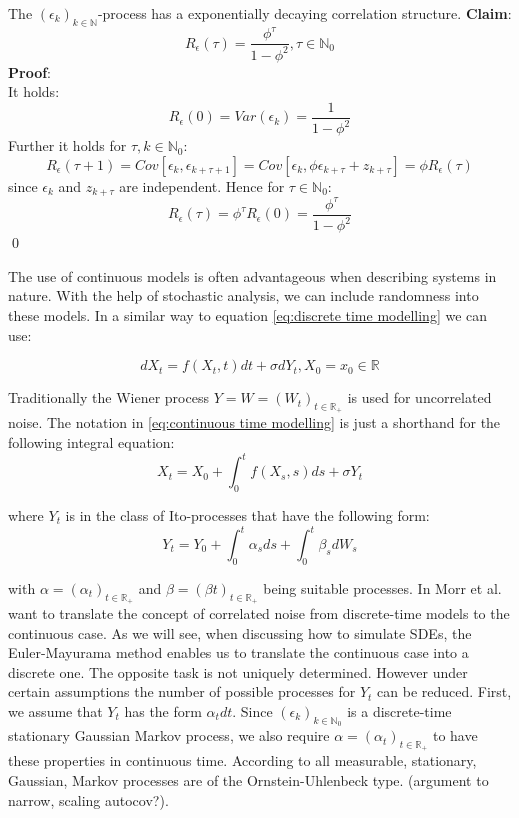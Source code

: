 \documentclass[%
thesis=student,%
coverpage=false,%
titlepage=false,%
headmarks=true, %
english,%
font=libertine, %
math=newpxtx, %
BCOR=5mm,%
coverBCOR=11mm%
]{tumbook}
\begin{document}
The $(\epsilon_{k})_{k \in \mathbb{N}}$-process has a exponentially decaying correlation structure. \textbf{Claim}:
\[
R_{\epsilon}(\tau) = \frac{\phi^{\tau}}{1-\phi^{2}}, \tau \in \mathbb{N}_{0}
\]
\textbf{Proof}: \\
It holds: 
\[
R_{\epsilon}(0)= Var(\epsilon_{k}) = \frac{1}{1-\phi^{2}}
\]
Further it holds for $\tau, k \in \mathbb{N}_{0}$:
\[
R_{\epsilon}(\tau+1) = Cov[\epsilon_{k},\epsilon_{k+\tau + 1}] = Cov[\epsilon_{k},\phi\epsilon_{k+\tau}+z_{k+\tau}] = \phi R_{\epsilon}(\tau)
\]
since $\epsilon_{k}$ and $z_{k+\tau}$ are independent. Hence for $\tau \in \mathbb{N}_{0}$:
\[
R_{\epsilon}(\tau) = \phi^{\tau}R_{\epsilon}(0)=\frac{\phi^{\tau}}{1-\phi^{2}}
\]
\qed

The use of continuous models is often advantageous when describing systems in nature. With the help of stochastic analysis, we can include randomness into these models. In a similar way to equation \ref{eq:discrete time modelling} we can use: 

\begin{equation}
    dX_{t} = f(X_{t},t)dt + \sigma dY_{t}, X_{0} = x_{0} \in \mathbb{R}
    \label{eq:continuous time modelling}
\end{equation}

Traditionally the Wiener process $Y = W = (W_{t})_{t\in \mathbb{R}_{+}}$ is used for uncorrelated noise. The notation in \ref{eq:continuous time modelling} is just a shorthand for the following integral equation:
\[
X_{t} = X_{0} + \int_{0}^{t}f(X_{s},s)ds + \sigma Y_{t}
\]

where $Y_{t}$ is in the class of Ito-processes that have the following form:
\begin{equation}
    Y_{t} = Y_{0} + \int_{0}^{t}\alpha_{s}ds + \int_{0}^{t}\beta_{s}dW_{s}
    \label{eq:Ito process}
\end{equation}

with $\alpha = (\alpha_{t})_{t\in\mathbb{R}_{+}}$ and $\beta = (\beta{t})_{t\in\mathbb{R}_{+}}$ being suitable processes.
In \cite{Morr:2022} Morr et al. want to translate the concept of correlated noise from discrete-time models to the continuous case. As we will see, when discussing how to simulate SDEs, the Euler-Mayurama method enables us to translate the continuous case into a discrete one. The opposite task is not uniquely determined. However under certain assumptions the number of possible processes for $Y_{t}$ can be reduced. First, we assume that $Y_{t}$ has the form $\alpha_{t}dt$. Since $(\epsilon_{k})_{k\in\mathbb{N}_{0}}$ is a discrete-time stationary Gaussian Markov process, we also require $\alpha = (\alpha_{t})_{t\in\mathbb{R}_{+}}$ to have these properties in continuous time. According to \cite{doob:1942} all measurable, stationary, Gaussian, Markov processes are of the Ornstein-Uhlenbeck type. (argument to narrow, scaling autocov?).
\end{document}
